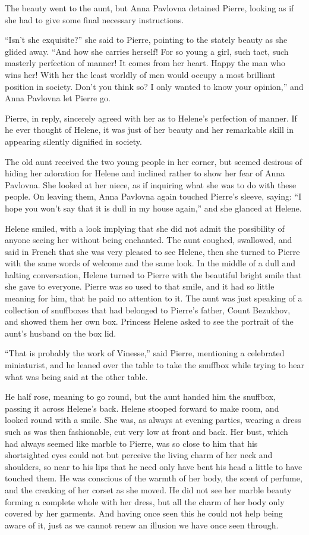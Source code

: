 The beauty went to the aunt, but Anna Pavlovna detained Pierre,
looking as if she had to give some final necessary instructions.

``Isn't she exquisite?'' she said to Pierre, pointing to the
stately beauty as she glided away. ``And how she carries herself!
For so young a girl, such tact, such masterly perfection of
manner! It comes from her heart. Happy the man who wins her! With
her the least worldly of men would occupy a most brilliant
position in society. Don't you think so? I only wanted to know
your opinion,'' and Anna Pavlovna let Pierre go.

Pierre, in reply, sincerely agreed with her as to Helene's
perfection of manner. If he ever thought of Helene, it was just
of her beauty and her remarkable skill in appearing silently
dignified in society.

The old aunt received the two young people in her corner, but
seemed desirous of hiding her adoration for Helene and inclined
rather to show her fear of Anna Pavlovna. She looked at her
niece, as if inquiring what she was to do with these people. On
leaving them, Anna Pavlovna again touched Pierre's sleeve,
saying: ``I hope you won't say that it is dull in my house
again,'' and she glanced at Helene.

Helene smiled, with a look implying that she did not admit the
possibility of anyone seeing her without being enchanted. The
aunt coughed, swallowed, and said in French that she was very
pleased to see Helene, then she turned to Pierre with the same
words of welcome and the same look. In the middle of a dull and
halting conversation, Helene turned to Pierre with the beautiful
bright smile that she gave to everyone. Pierre was so used to
that smile, and it had so little meaning for him, that he paid no
attention to it. The aunt was just speaking of a collection of
snuffboxes that had belonged to Pierre's father, Count Bezukhov,
and showed them her own box. Princess Helene asked to see the
portrait of the aunt's husband on the box lid.

``That is probably the work of Vinesse,'' said Pierre, mentioning
a celebrated miniaturist, and he leaned over the table to take
the snuffbox while trying to hear what was being said at the
other table.

He half rose, meaning to go round, but the aunt handed him the
snuffbox, passing it across Helene's back. Helene stooped forward
to make room, and looked round with a smile. She was, as always
at evening parties, wearing a dress such as was then fashionable,
cut very low at front and back. Her bust, which had always seemed
like marble to Pierre, was so close to him that his shortsighted
eyes could not but perceive the living charm of her neck and
shoulders, so near to his lips that he need only have bent his
head a little to have touched them. He was conscious of the
warmth of her body, the scent of perfume, and the creaking of her
corset as she moved. He did not see her marble beauty forming a
complete whole with her dress, but all the charm of her body only
covered by her garments. And having once seen this he could not
help being aware of it, just as we cannot renew an illusion we
have once seen through.

